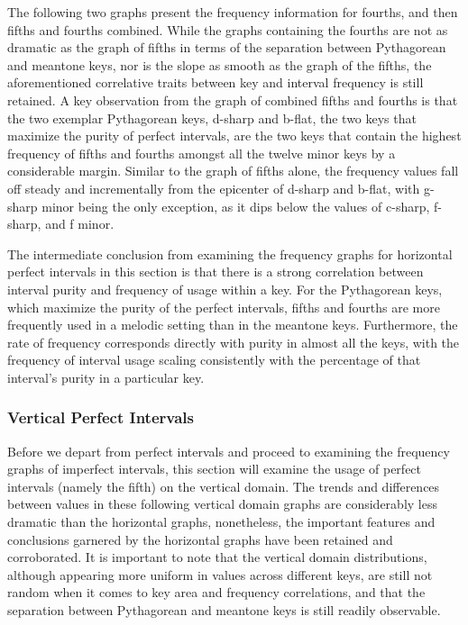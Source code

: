 The following two graphs present the frequency information for fourths,
and then fifths and fourths combined. While the graphs containing the
fourths are not as dramatic as the graph of fifths in terms of the
separation between Pythagorean and meantone keys, nor is the slope as
smooth as the graph of the fifths, the aforementioned correlative traits
between key and interval frequency is still retained. A key observation
from the graph of combined fifths and fourths is that the two exemplar
Pythagorean keys, d-sharp and b-flat, the two keys that maximize the
purity of perfect intervals, are the two keys that contain the highest
frequency of fifths and fourths amongst all the twelve minor keys by a
considerable margin. Similar to the graph of fifths alone, the frequency
values fall off steady and incrementally from the epicenter of d-sharp
and b-flat, with g-sharp minor being the only exception, as it dips
below the values of c-sharp, f-sharp, and f minor.


    \begin{center}
    \end{center}
    
    The intermediate conclusion from examining the frequency graphs for
horizontal perfect intervals in this section is that there is a strong
correlation between interval purity and frequency of usage within a key.
For the Pythagorean keys, which maximize the purity of the perfect
intervals, fifths and fourths are more frequently used in a melodic
setting than in the meantone keys. Furthermore, the rate of frequency
corresponds directly with purity in almost all the keys, with the
frequency of interval usage scaling consistently with the percentage of
that interval's purity in a particular key.

    \subsubsection{Vertical Perfect
Intervals}\label{vertical-perfect-intervals}

Before we depart from perfect intervals and proceed to examining the
frequency graphs of imperfect intervals, this section will examine the
usage of perfect intervals (namely the fifth) on the vertical domain.
The trends and differences between values in these following vertical
domain graphs are considerably less dramatic than the horizontal graphs,
nonetheless, the important features and conclusions garnered by the
horizontal graphs have been retained and corroborated. It is important
to note that the vertical domain distributions, although appearing more
uniform in values across different keys, are still not random when it
comes to key area and frequency correlations, and that the separation
between Pythagorean and meantone keys is still readily observable.

